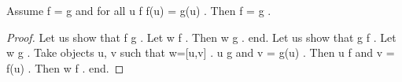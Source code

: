 \documentclass[a4paper,draft]{amsproc}
\begin{document}
\begin{forthel}
\begin{theorem}
Assume  \domain f = \domain g  and for all  u \in \domain f f(u) = g(u) . Then  f = g .
\end{theorem}
\begin{proof}
Let us show that  f \subset g .
Let  w \in f . 
Then  w \in g . end.
Let us show that  g \subset f .
Let  w \in g .  
Take objects  u, v  such that  w=[u,v] .
 u \in \domain g  and  v = g(u) .
Then  u \in \domain f  and  v = f(u) .
Then  w \in f . end.
\end{proof}


\end{forthel}
\end{document}
